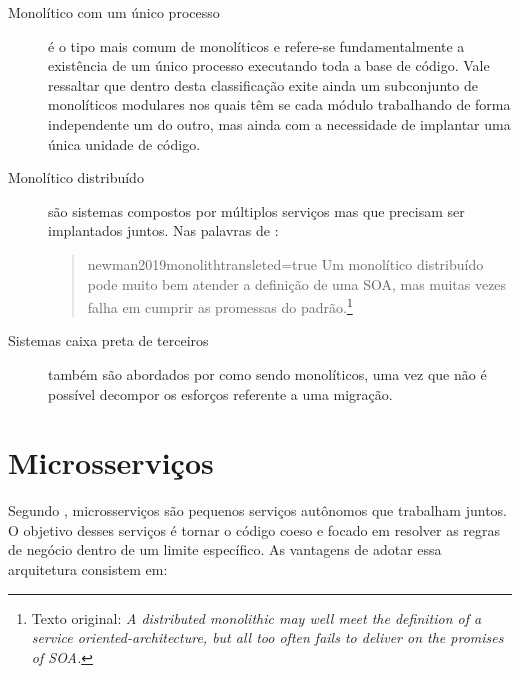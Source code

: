 \begin{description}
    \item [Monolítico com um único processo] é o tipo mais comum de monolíticos e refere-se
        fundamentalmente a existência de um único processo executando toda a base de código. Vale
        ressaltar que dentro desta classificação exite ainda um subconjunto de monolíticos
        modulares nos quais têm se cada módulo trabalhando de forma independente um do outro, mas
        ainda com a necessidade de implantar uma única unidade de código.

    \item [Monolítico distribuído] são sistemas compostos por múltiplos serviços mas que precisam
        ser implantados juntos. Nas palavras de :

        \begin{quotation}{newman2019monolith}{transleted=true}
        Um monolítico distribuído pode muito bem atender a definição de uma \gls{SOA}, mas muitas vezes
        falha em cumprir as promessas do padrão.\footnote{Texto original: \textit{A distributed
        monolithic may well meet the definition of a service oriented-architecture, but all too
        often fails to deliver on the promises of SOA.}}
        \end{quotation}
    \item [Sistemas caixa preta de terceiros] também são abordados por 
        como sendo monolíticos, uma vez que não é possível decompor os esforços referente a uma
        migração.
\end{description}

\section{Microsserviços}

Segundo , microsserviços são pequenos serviços autônomos que
trabalham juntos. O objetivo desses serviços é tornar o código coeso e focado em
resolver as regras de negócio dentro de um limite específico. As vantagens de adotar
essa arquitetura consistem em:

